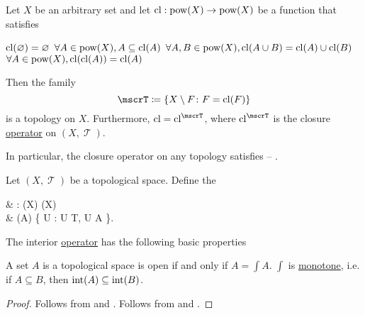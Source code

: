 \begin{proposition}\label{thm:closure_operator_axioms}
  Let \( X \) be an arbitrary set and let \( \operatorname{cl}: \operatorname{pow}(X) \to \operatorname{pow}(X) \) be a function that satisfies
  \begin{thmenum}
     \( \operatorname{cl}(\varnothing) = \varnothing \)
     \( \forall A \in \operatorname{pow}(X), A \subseteq \operatorname{cl}(A) \)
     \( \forall A, B \in \operatorname{pow}(X), \operatorname{cl}(A \cup B) = \operatorname{cl}(A) \cup \operatorname{cl}(B) \)
     \( \forall A \in \operatorname{pow}(X), \operatorname{cl}(\operatorname{cl}(A)) = \operatorname{cl}(A) \)
  \end{thmenum}

  Then the family
  \begin{equation*}
    \mscrT \coloneqq \{ X \setminus F \colon F = \cl(F) \}
  \end{equation*}
  is a topology on \( X \). Furthermore, \( \cl = \cl^{\mscrT} \), where \( \cl^{\mscrT} \) is the closure \hyperref[def:closure_operator]{operator} on \( (X, \mscrT) \).

  In particular, the closure operator on any topology satisfies  -- .
\end{proposition}

\begin{definition}\label{def:interior_operator}
  Let \( (X, \mscrT) \) be a topological space. Define the 
  \begin{balign*}
     & \inter: \pow(X) \to \pow(X)                                     \\
     & \inter(A) \coloneqq \bigcup \{ U : U \in T, U \subseteq A \}.
  \end{balign*}
\end{definition}

\begin{proposition}\label{thm:interior_operator_properties}
  The interior \hyperref[def:interior_operator]{operator} has the following basic properties
  \begin{thmenum}
     A set \( A \) is a topological space is open if and only if \( A = \int A \).
     \( \int \) is \hyperref[def:preordered_set/homomorphism]{monotone}, i.e. if \( A \subseteq B \), then \( \operatorname{int}(A) \subseteq \operatorname{int}(B) \).
  \end{thmenum}
\end{proposition}
\begin{proof}
   Follows from  and .
   Follows from  and .
\end{proof}

